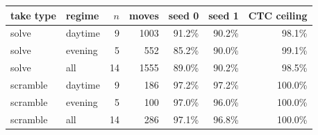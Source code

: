 \begin{tabular}{@{}llrrrrr@{}}
\toprule
take type & regime & $n$ & moves & seed 0 & seed 1 & CTC ceiling \\
\midrule
solve & daytime & 9 & 1003 & 91.2\% & 90.2\% & 98.1\% \\
solve & evening & 5 & 552 & 85.2\% & 90.0\% & 99.1\% \\
solve & all & 14 & 1555 & 89.0\% & 90.2\% & 98.5\% \\
\midrule
scramble & daytime & 9 & 186 & 97.2\% & 97.2\% & 100.0\% \\
scramble & evening & 5 & 100 & 97.0\% & 96.0\% & 100.0\% \\
scramble & all & 14 & 286 & 97.1\% & 96.8\% & 100.0\% \\
\bottomrule
\end{tabular}
